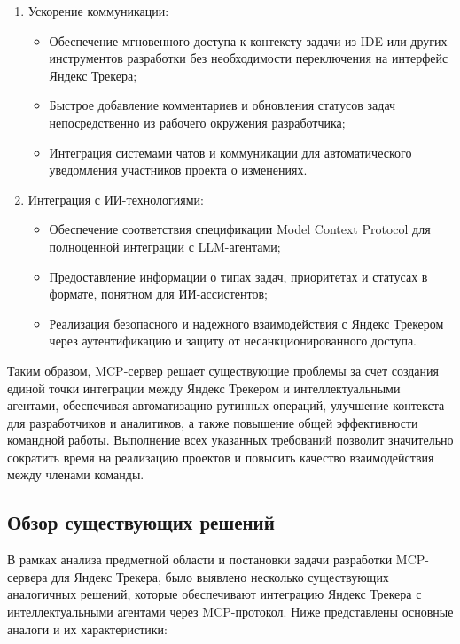 \documentclass[utf8, russian]{eskdtext}
\begin{document}
\begin{enumerate}
\item{ Ускорение коммуникации:}
\begin{itemize}
    \item Обеспечение мгновенного доступа к контексту задачи из IDE или других инструментов разработки без необходимости переключения на интерфейс Яндекс Трекера;
    \item Быстрое добавление комментариев и обновления статусов задач непосредственно из рабочего окружения разработчика;
    \item Интеграция системами чатов и коммуникации для автоматического уведомления участников проекта о изменениях.
\end{itemize}

\item{ Интеграция с ИИ-технологиями:}
\begin{itemize}
    \item Обеспечение соответствия спецификации Model Context Protocol для полноценной интеграции с LLM-агентами;
    \item Предоставление информации о типах задач, приоритетах и статусах в формате, понятном для ИИ-ассистентов;
    \item Реализация безопасного и надежного взаимодействия с Яндекс Трекером через аутентификацию и защиту от несанкционированного доступа.
\end{itemize}
\end{enumerate}

Таким образом, MCP-сервер решает существующие проблемы за счет создания единой точки интеграции между Яндекс Трекером и интеллектуальными агентами, обеспечивая автоматизацию рутинных операций, улучшение контекста для разработчиков и аналитиков, а также повышение общей эффективности командной работы. Выполнение всех указанных требований позволит значительно сократить время на реализацию проектов и повысить качество взаимодействия между членами команды.

\subsection{Обзор существующих решений}
 
В рамках анализа предметной области и постановки задачи разработки MCP-сервера для Яндекс Трекера, было выявлено несколько существующих аналогичных решений, которые обеспечивают интеграцию Яндекс Трекера с интеллектуальными агентами через MCP-протокол. Ниже представлены основные аналоги и их характеристики:
\end{document}
